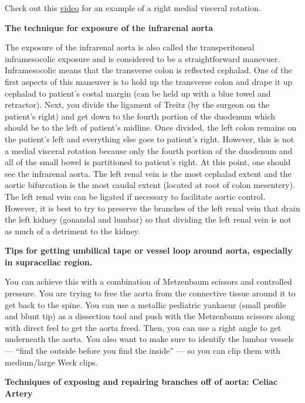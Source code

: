 \documentclass[
]{book}
\begin{document}
Check out this \href{https://www.youtube.com/watch?v=KVuMiAuw5zc}{video} for an example of a right medial visceral rotation.

\textbf{The technique for exposure of the infrarenal aorta}

The exposure of the infrarenal aorta is also called the transperitoneal
inframesocolic exposure and is considered to be a straightforward
manevuer. Inframesocolic means that the transverse colon is reflected
cephalad. One of the first aspects of this maneuver is to hold up the
transverse colon and drape it up cephalad to patient's costal margin
(can be held up with a blue towel and retractor). Next, you divide the
ligament of Treitz (by the surgeon on the patient's right) and get down
to the fourth portion of the duodenum which should be to the left of
patient's midline. Once divided, the left colon remains on the patient's
left and everything else goes to patient's right. However, this is not a
medial visceral rotation because only the fourth portion of the duodenum
and all of the small bowel is partitioned to patient's right. At this
point, one should see the infrarenal aorta. The left renal vein is the
most cephalad extent and the aortic bifurcation is the most caudal
extent (located at root of colon mesentery). The left renal vein can be
ligated if necessary to facilitate aortic control. However, it is best
to try to preserve the branches of the left renal vein that drain the
left kidney (gonandal and lumbar) so that dividing the left renal vein
is not as much of a detriment to the kidney.

\textbf{Tips for getting umbilical tape or vessel loop around aorta,
especially in supraceliac region.}

You can achieve this with a combination of Metzenbaum scissors and
controlled pressure. You are trying to free the aorta from the
connective tissue around it to get back to the spine. You can use a
metallic pediatric yankaeur (small profile and blunt tip) as a
dissection tool and push with the Metzenbaum scissors along with direct
feel to get the aorta freed. Then, you can use a right angle to get
underneath the aorta. You also want to make sure to identify the lumbar
vessels --- ``find the outside before you find the inside'' --- so you can
clip them with medium/large Weck clips.

\textbf{Techniques of exposing and repairing branches off of aorta: Celiac
Artery}
\end{document}
